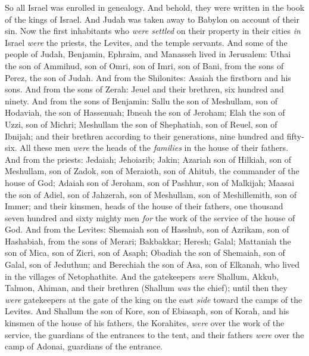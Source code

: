 \begin{biblechapter} %
 So all Israel was enrolled in genealogy. And behold, they were written in the book of the kings of Israel. And Judah was taken away to Babylon on account of their sin.
\verse Now the first inhabitants who \textit{were settled} on their property in their cities \textit{in} Israel \textit{were} the priests, the Levites, and the temple servants.
\verse And some of the people of Judah, Benjamin, Ephraim, and Manasseh lived in Jerusalem:
\verse Uthai the son of Ammihud, son of Omri, son of Imri, son of Bani, from the sons of Perez, the son of Judah.
\verse And from the Shilonites: Asaiah the firstborn and his sons.
\verse And from the sons of Zerah: Jeuel and their brethren, six hundred and ninety.
\verse And from the sons of Benjamin: Sallu the son of Meshullam, son of Hodaviah, the son of Hassenuah;
\verse Ibneah the son of Jeroham; Elah the son of Uzzi, son of Michri; Meshullam the son of Shephatiah, son of Reuel, son of Ibnijah;
\verse and their brethren according to their generations, nine hundred and fifty-six. All these men \textit{were} the heads of the \textit{families} in the house of their fathers.
\verse And from the priests: Jedaiah; Jehoiarib; Jakin;
\verse Azariah son of Hilkiah, son of Meshullam, son of Zadok, son of Meraioth, son of Ahitub, the commander of the house of God;
\verse Adaiah son of Jeroham, son of Pashhur, son of Malkijah; Maasai the son of Adiel, son of Jahzerah, son of Meshullam, son of Meshillemith, son of Immer;
\verse and their kinsmen, heads of the house of their fathers, one thousand seven hundred and sixty mighty men \textit{for} the work of the service of the house of God.
\verse And from the Levites: Shemaiah son of Hasshub, son of Azrikam, son of Hashabiah, from the sons of Merari;
\verse Bakbakkar; Heresh; Galal; Mattaniah the son of Mica, son of Zicri, son of Asaph;
\verse Obadiah the son of Shemaiah, son of Galal, son of Jeduthun; and Berechiah the son of Asa, son of Elkanah, who lived in the villages of Netophathite.
\verse And the gatekeepers \textit{were} Shallum, Akkub, Talmon, Ahiman, and their brethren (Shallum \textit{was} the chief);
\verse until then they \textit{were} gatekeepers at the gate of the king on the east \textit{side} toward the camps of the Levites.
\verse And Shallum the son of Kore, son of Ebiasaph, son of Korah, and his kinsmen of the house of his fathers, the Korahites, \textit{were} over the work of the service, the guardians of the entrances to the tent, and their fathers \textit{were} over the camp of Adonai, guardians of the entrance.

\end{biblechapter}
